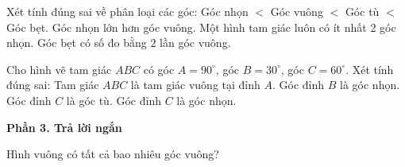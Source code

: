 \begin{ex} %
Xét tính đúng sai về phân loại các góc:
\choiceTF
{\True Góc nhọn $<$ Góc vuông $<$ Góc tù $<$ Góc bẹt.}
{Góc nhọn lớn hơn góc vuông.}
{\True Một hình tam giác luôn có ít nhất 2 góc nhọn.}
{\True Góc bẹt có số đo bằng $2$ lần góc vuông.}
\end{ex}

\begin{ex} %
Cho hình vẽ tam giác $ABC$ có góc $A = 90^\circ$, góc $B = 30^\circ$, góc $C = 60^\circ$. Xét tính đúng sai:
\choiceTF
{\True Tam giác $ABC$ là tam giác vuông tại đỉnh $A$.}
{\True Góc đỉnh $B$ là góc nhọn.}
{Góc đỉnh $C$ là góc tù.}
{\True Góc đỉnh $C$ là góc nhọn.}
\end{ex}

\textbf{Phần 3. Trả lời ngắn}

\begin{ex} %
Hình vuông có tất cả bao nhiêu góc vuông?
\end{ex}

